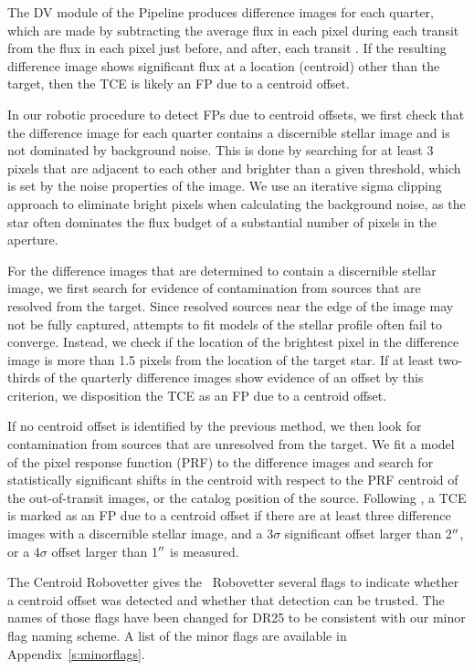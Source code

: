 The DV module of the \kepler{} Pipeline produces difference images for each quarter, which are made by subtracting the average flux in each pixel during each transit from the flux in each pixel just before, and after, each transit \citep{Bryson2013}. If the resulting difference image shows significant flux at a location (centroid) other than the target, then the TCE is likely an FP due to a centroid offset.

In our robotic procedure to detect FPs due to centroid offsets, we first check that the difference image for each quarter contains a discernible stellar image and is not dominated by background noise. This is done by searching for at least 3 pixels that are adjacent to each other and brighter than a given threshold, which is set by the noise properties of the image. We use an iterative sigma clipping approach to eliminate bright pixels when calculating the background noise, as the star often dominates the flux budget of a substantial number of pixels in the aperture.


For the difference images that are determined to contain a discernible stellar image, we first search for evidence of contamination from sources that are resolved from the target. Since resolved sources near the edge of the image may not be fully captured, attempts to fit models of the stellar profile often fail to converge. Instead, we check if the location of the brightest pixel in the difference image is more than 1.5 pixels from the location of the target star. If at least two-thirds of the quarterly difference images show evidence of an offset by this criterion, we disposition the TCE as an FP due to a centroid offset. 

If no centroid offset is identified by the previous method, we then look for contamination from sources that are unresolved from the target. We fit a model of the pixel response function (PRF) to the difference images and search for statistically significant shifts in the centroid with respect to the PRF centroid of the out-of-transit images, or the catalog position of the source. Following \citet{Bryson2013}, a TCE is marked as an FP due to a centroid offset if there are at least three difference images with a discernible stellar image, and a 3$\sigma$ significant offset larger than 2$\mbox{$^{\prime\prime}$}$, or a 4$\sigma$ offset larger than 1$\mbox{$^{\prime\prime}$}$ is measured.  

The Centroid Robovetter gives the \kepler\ Robovetter several flags to indicate whether a centroid offset was detected and whether that detection can be trusted. The names of those flags have been changed for DR25 to be consistent with our minor flag naming scheme. A list of the minor flags are available in Appendix~\ref{s:minorflags}.


